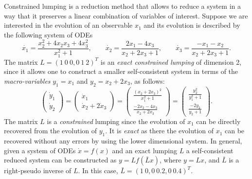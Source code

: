 Constrained lumping is a reduction method that allows to reduce a system in a way that it preserves a linear combination of variables of interest.
Suppose we are interested in the evolution of an observable $x_1$ and its evolution is described by the following system of ODEs
\begin{equation} \label{eq:example1}
	\dot{x_{1}} = \frac {x_{2}^{2} +4x_{2}x_{3} +4x_{3}^{2}}{x_{1}^{2} + 1 },\qquad
	\dot{x_{2}} = \frac{2x_{1}-4x_{3}}{x_{2}+2x_{3} + 1},\qquad
	\dot{x_{3}} = \frac{-x_{1}-x_{2}}{x_{2}+2x_{3}+1}.
\end{equation}
The matrix $L = (1 \ 0\ 0, 0\ 1\  2)^{T}$ is an \textit{exact constrained lumping} of dimension 2, since it allows one to construct a smaller self-consistent system in terms of the \textit{macro-variables} $y_1= x_1$ and $ y_2 = x_2 + 2x_3$, as follows:
\begin{equation*}
	\begin{pmatrix}
		\dot{y}_{1} \\
		\dot{y}_{2}
	\end{pmatrix}
	=
	\begin{pmatrix}
		\dot{x}_{1} \\
		\dot{x}_{2} +2 \dot{x}_{3}
	\end{pmatrix}
	=
	\begin{pmatrix}
		\frac{(x_{2}+2x_{3})^{2}}{x_{1}^{2}+1} \\
		\frac{-2x_{2}-4x_{3}}{x_{2}+2x_{3}}
	\end{pmatrix}
	=
	\begin{pmatrix}
		\frac{y_{2}^{2}}{y_{1}^{2}+1} \\
		\frac{-2y_{2}}{y_{2}+1}
	\end{pmatrix}.
\end{equation*}
The matrix $L$ is a \textit{constrained} lumping since the evolution of $x_1$ can be directly recovered from the evolution of $y_1$.
It is \textit{exact} as there the evolution of $x_1$ can be recovered without any errors by using the lower dimensional system.
In general, given a system of ODEs $\dot{x} = f(x)$  and an exact lumping $L$ a self-consistent reduced system can be constructed as
$y= L f(\bar{L}x)$, where $y = Lx$, and $\bar{L}$ is a right-pseudo inverse of $L$.
In this case, $\bar{L} = (1 \ 0, 0 \ 0.2, 0 \ 0.4)^{T}$.

